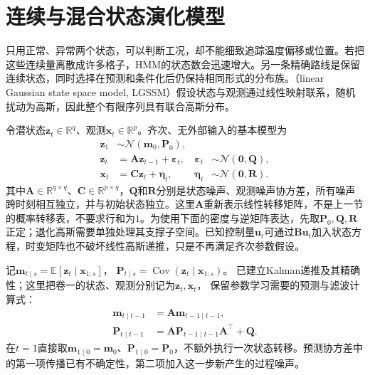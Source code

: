 \section{连续与混合状态演化模型}
\label{sec:pgm-dynamic-continuous}

只用正常、异常两个状态，可以判断工况，却不能细致追踪温度偏移或位置。若把这些连续量离散成许多格子，HMM的状态数会迅速增大。另一条精确路线是保留连续状态，同时选择在预测和条件化后仍保持相同形式的分布族。（linear Gaussian state space model, LGSSM）假设状态与观测通过线性映射联系，随机扰动为高斯，因此整个有限序列具有联合高斯分布。

令潜状态$\bm{z}_t\in\mathbb{R}^{q}$、观测$\bm{x}_t\in\mathbb{R}^{p}$。齐次、无外部输入的基本模型为
\begin{equation}
  \begin{aligned}
    \bm{z}_1&\sim\mathcal{N}(\bm{m}_0,\bm{P}_0),\\
    \bm{z}_t&=\bm{A}\bm{z}_{t-1}+\bm{\varepsilon}_t,
      &\bm{\varepsilon}_t&\sim\mathcal{N}(\bm{0},\bm{Q}),\\
    \bm{x}_t&=\bm{C}\bm{z}_t+\bm{\eta}_t,
      &\bm{\eta}_t&\sim\mathcal{N}(\bm{0},\bm{R}).
  \end{aligned}
  \label{eq:pgm-dynamic-lgssm}
\end{equation}
其中$\bm{A}\in\mathbb{R}^{q\times q}$、$\bm{C}\in\mathbb{R}^{p\times q}$，$\bm{Q}$和$\bm{R}$分别是状态噪声、观测噪声协方差，所有噪声跨时刻相互独立，并与初始状态独立。这里$\bm{A}$重新表示线性转移矩阵，不是上一节的概率转移表，不要求行和为$1$。为使用下面的密度与逆矩阵表达，先取$\bm{P}_0,\bm{Q},\bm{R}$正定；退化高斯需要单独处理其支撑子空间。已知控制量$\bm{u}_t$可通过$\bm{B}\bm{u}_t$加入状态方程，时变矩阵也不破坏线性高斯递推，只是不再满足齐次参数假设。

记$\bm{m}_{t\mid s}=\mathbb{E}[\bm{z}_t\mid\bm{x}_{1:s}]$，
$\bm{P}_{t\mid s}=\operatorname{Cov}(\bm{z}_t\mid\bm{x}_{1:s})$。
已建立Kalman递推及其精确性；这里把卷一的状态、观测分别记为$\bm z_t,\bm x_t$，
保留参数学习需要的预测与滤波计算式：
\begin{equation}
  \begin{aligned}
    \bm{m}_{t\mid t-1}&=\bm{A}\bm{m}_{t-1\mid t-1},\\
    \bm{P}_{t\mid t-1}
      &=\bm{A}\bm{P}_{t-1\mid t-1}\bm{A}^{\top}
        +\bm{Q}.
  \end{aligned}
  \label{eq:pgm-dynamic-kalman-predict}
\end{equation}
在$t=1$直接取$\bm{m}_{1\mid0}=\bm{m}_0$、$\bm{P}_{1\mid0}=\bm{P}_0$，不额外执行一次状态转移。预测协方差中的第一项传播已有不确定性，第二项加入这一步新产生的过程噪声。

